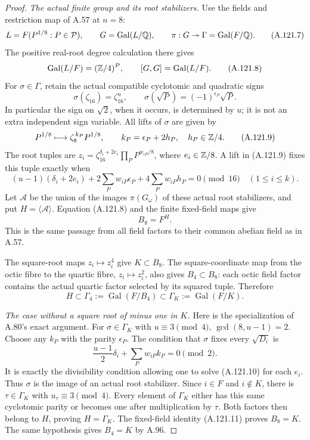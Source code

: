\begin{proof}
\emph{The actual finite group and its root stabilizers.}
Use the fields and restriction map of A.57 at $n=8$:
\[
 L=F(P^{1/8}:P\in\mathcal P),\qquad
 G=\operatorname{Gal}(L/\mathbb Q),\qquad
 \pi:G\twoheadrightarrow\Gamma=\operatorname{Gal}(F/\mathbb Q).
\tag{A.121.7}
\]
The positive real-root degree calculation there gives
\[
 \operatorname{Gal}(L/F)=(\mathbb Z/4)^{\mathcal P},
 \qquad [G,G]=\operatorname{Gal}(L/F).
\tag{A.121.8}
\]
For $\sigma\in\Gamma$, retain the actual compatible
cyclotomic and quadratic signs
\[
 \sigma(\zeta_{16})=\zeta_{16}^{u},\qquad
 \sigma(\sqrt P)=(-1)^{\epsilon_P}\sqrt P.
\]
In particular the sign on $\sqrt2$, when it occurs,
is determined by $u$; it is not an extra independent
sign variable.
All lifts of $\sigma$ are given by
\[
 P^{1/8}\longmapsto\zeta_8^{\,k_P}P^{1/8},
       \qquad k_P=\epsilon_P+2h_P,\quad h_P\in\mathbb Z/4.
\tag{A.121.9}
\]
The root tuples are
$z_i=\zeta_{16}^{\delta_i+2e_i}\prod_P P^{w_{iP}/8}$,
where $e_i\in\mathbb Z/8$.
A lift in (A.121.9) fixes this tuple exactly when
\[
 (u-1)(\delta_i+2e_i)
       +2\sum_Pw_{iP}\epsilon_P
       +4\sum_Pw_{iP}h_P=0\pmod {16}
                                     \quad(1\le i\le k).
\tag{A.121.10}
\]
Let $\mathcal A$ be the union of the images
$\pi(G_\omega)$ of these actual root stabilizers, and put
$H=\langle\mathcal A\rangle$.
Equation (A.121.8) and the finite fixed-field maps give
\[
                         B_8=F^H .
\tag{A.121.11}
\]
This is the same passage from all field factors to
their common abelian field as in A.57.

The square-root maps $z_i\mapsto z_i^4$ give $K\subset B_8$.
The square-coordinate map from the octic fibre to the quartic
fibre, $z_i\mapsto z_i^2$, also gives $B_4\subset B_8$:
each octic field factor contains the actual quartic factor
selected by its squared tuple.
Therefore
\[
              H\subset\Gamma_4:=\operatorname{Gal}(F/B_4)
                          \subset\Gamma_K:=\operatorname{Gal}(F/K).
\tag{A.121.12}
\]

\emph{The case without a square root of minus one in $K$.}
Here is the specialization of A.80's exact argument.
For $\sigma\in\Gamma_K$ with $u\equiv3\pmod4$,
$\gcd(8,u-1)=2$.
Choose any $k_P$ with the parity $\epsilon_P$.
The condition that $\sigma$ fixes every $\sqrt{D_i}$ is
\[
        \frac{u-1}{2}\delta_i+\sum_Pw_{iP}k_P=0\pmod2.
\]
It is exactly the divisibility condition allowing one to
solve (A.121.10) for each $e_i$.
Thus $\sigma$ is the image of an actual root stabilizer.
Since $i\in F$ and $i\notin K$, there is
$\tau\in\Gamma_K$ with $u_\tau\equiv3\pmod4$.
Every element of $\Gamma_K$ either has this same
cyclotomic parity or becomes one after multiplication by
$\tau$.
Both factors then belong to $H$, proving $H=\Gamma_K$.
The fixed-field identity (A.121.11) proves $B_8=K$.
The same hypothesis gives $B_4=K$ by A.96.


\end{proof}
